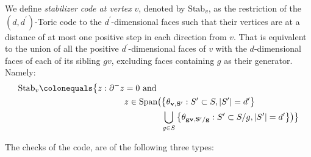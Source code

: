 \begin{definition}
We define \textit{stabilizer code at vertex} $v$, denoted by $\text{Stab}_{v}$, as the restriction of the $(d,d^{\prime})$-Toric code to the $d^{\prime}$-dimensional faces such that their vertices are at a distance of at most one positive step in each direction from $v$. That is equivalent to the union of all the positive $d^{\prime}$-dimensional faces of $v$ with the $d$-dimensional faces of each of its sibling $gv$, excluding faces containing $g$ as their generator. Namely:
  \begin{align*}
    \text{Stab}_{v} \colonequals  \bigl\{ z : \partial^{-} z  &= 0 \text{ and } \\
    & z \in \text{Span} \big(  \big\{  \rotfvs{} : S^{\prime} \subset S, |S^{\prime}| = d^{\prime}  \big\} \\
   & \ \ \ \ \ \ \ \ \ \ \ \ \  \bigcup_{g \in S} \big\{ \rotfv{gv}{S^{\prime}/g} : S^{\prime} \subset S/g , |S^{\prime}|=d^{\prime} \big\} \big) \bigr\}
  \end{align*}
\end{definition}
The checks of the code, are of the following three types: 
